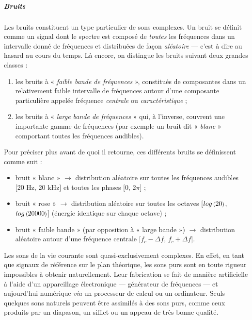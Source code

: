 \subparagraph{Bruits} Les bruits constituent un type particulier de sons complexes. Un bruit se définit comme un signal dont le spectre est composé de \emph{toutes} les fréquences dans un intervalle donné de fréquences et distribuées de façon \emph{aléatoire} --- c'est à dire au hasard au cours du temps. Là encore, on distingue les bruits suivant deux grandes classes :
\begin{enumerate}
	\item les bruits à « \emph{faible bande de fréquences} », constitués de composantes dans un relativement faible intervalle de fréquences autour d'une composante particulière appelée fréquence \emph{centrale} ou \emph{caractéristique} ;
	\item les bruits à « \emph{large bande de fréquences} » qui, à l'inverse, couvrent une importante gamme de fréquences (par exemple un bruit dit « \emph{blanc} » comportant toutes les fréquences audibles).
\end{enumerate}
Pour préciser plus avant de quoi il retourne, ces différents bruits se définissent comme suit :
\begin{itemize}
\item bruit « blanc » $\rightarrow$ distribution aléatoire sur toutes les fréquences audibles [20 Hz, 20 kHz] et toutes les phases [0, 2$\pi$] ;
\item bruit « rose » $\rightarrow$ distribution aléatoire sur toutes les octaves [$\mathop{log}\nolimits\mbox{\footnotesize (} 20 \mbox{\footnotesize )}$, $\mathop{log}\nolimits\mbox{\footnotesize (} 20000 \mbox{\footnotesize )}$] (énergie identique sur chaque octave) ;
\item bruit « faible bande » (par opposition à « large bande ») $\rightarrow$ distribution aléatoire autour d'une fréquence centrale [$f_c - \Delta f$, $f_c + \Delta f$].
\end{itemize}

Les sons de la vie courante sont quasi-exclusivement complexes. En effet, en tant que signaux de référence sur le plan théorique, les sons purs sont en toute rigueur impossibles à obtenir naturellement. Leur fabrication se fait de manière artificielle à l'aide d'un appareillage électronique --- générateur de fréquences --- et aujourd'hui numérique \textit{via} un processeur de calcul ou un ordinateur. Seuls quelques sons naturels peuvent être assimilés à des sons purs, comme ceux produits par un diapason, un sifflet ou un appeau de très bonne qualité.

